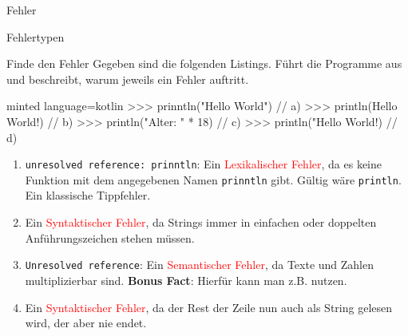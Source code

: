\begin{task}[points=auto]{Fehler}
\begin{subtask*}[points=0]{Fehlertypen }
\begin{solution}
        \end{solution}
    \end{subtask*}
    \begin{subtask*}[points=0]{Finde den Fehler }
        Gegeben sind die folgenden Listings. Führt die Programme aus und beschreibt, warum jeweils ein Fehler auftritt.
        \begin{codeBlock}[]{minted language=kotlin}
            >>> prinntln("Hello World") // a)
            >>> println(Hello World!)    // b)
            >>> println("Alter: " * 18)  // c)
            >>> println("Hello World!)   // d)
        \end{codeBlock}
        \begin{solution}
            \begin{enumerate}
                \item \texttt{unresolved reference: prinntln}: Ein \textcolor{red}{Lexikalischer Fehler}, da es keine Funktion mit dem angegebenen Namen
                    \texttt{prinntln} gibt. Gültig wäre \texttt{println}. Ein klassische Tippfehler.
                \item Ein \textcolor{red}{Syntaktischer Fehler}, da Strings immer in einfachen oder doppelten Anführungszeichen
                    stehen müssen.
                \item \texttt{Unresolved reference}: Ein \textcolor{red}{Semantischer Fehler}, da Texte und Zahlen multiplizierbar sind.
                    \textbf{Bonus Fact}: Hierfür kann man z.B.  nutzen.
                \item Ein \textcolor{red}{Syntaktischer Fehler}, da der Rest der Zeile nun auch als String gelesen wird, der aber nie endet.
            \end{enumerate}

        \end{solution}
    \end{subtask*}
\end{task}
